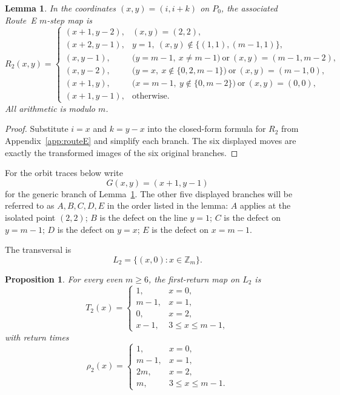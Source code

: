 \documentclass[11pt]{article}
\newtheorem{lemma}{Lemma}
\newtheorem{proposition}{Proposition}
\newcommand{\Zm}{\mathbb Z_m}
\begin{document}
\begin{lemma}\label{lem:R2-main-xy}
In the coordinates $(x,y)=(i,i+k)$ on $P_0$, the associated Route~E $m$-step map is
\[
R_2(x,y)=
\begin{cases}
(x+1,y-2),&(x,y)=(2,2),\\
(x+2,y-1),&y=1,\ (x,y)\notin\{(1,1),(m-1,1)\},\\
(x,y-1),&\bigl(y=m-1,\ x\neq m-1\bigr)\ \text{or}\ (x,y)=(m-1,m-2),\\
(x,y-2),&\bigl(y=x,\ x\notin\{0,2,m-1\}\bigr)\ \text{or}\ (x,y)=(m-1,0),\\
(x+1,y),&\bigl(x=m-1,\ y\notin\{0,m-2\}\bigr)\ \text{or}\ (x,y)=(0,0),\\
(x+1,y-1),&\text{otherwise}.
\end{cases}
\]
All arithmetic is modulo $m$.
\end{lemma}

\begin{proof}
Substitute $i=x$ and $k=y-x$ into the closed-form formula for $R_2$ from Appendix~\ref{app:routeE} and simplify each branch.
The six displayed moves are exactly the transformed images of the six original branches.
\end{proof}

For the orbit traces below write
\[
G(x,y)=(x+1,y-1)
\]
for the generic branch of Lemma~\ref{lem:R2-main-xy}.
The other five displayed branches will be referred to as $A,B,C,D,E$ in the order listed in the lemma:
$A$ applies at the isolated point $(2,2)$;
$B$ is the defect on the line $y=1$;
$C$ is the defect on $y=m-1$;
$D$ is the defect on $y=x$;
$E$ is the defect on $x=m-1$.

The transversal is
\[
L_2=\{(x,0):x\in \Zm\}.
\]

\begin{proposition}\label{prop:R2-main-data}
For every even $m\ge 6$, the first-return map on $L_2$ is
\[
T_2(x)=
\begin{cases}
1,&x=0,\\
m-1,&x=1,\\
0,&x=2,\\
x-1,&3\le x\le m-1,
\end{cases}
\]
with return times
\[
\rho_2(x)=
\begin{cases}
1,&x=0,\\
m-1,&x=1,\\
2m,&x=2,\\
m,&3\le x\le m-1.
\end{cases}
\]
\end{proposition}
\end{document}
